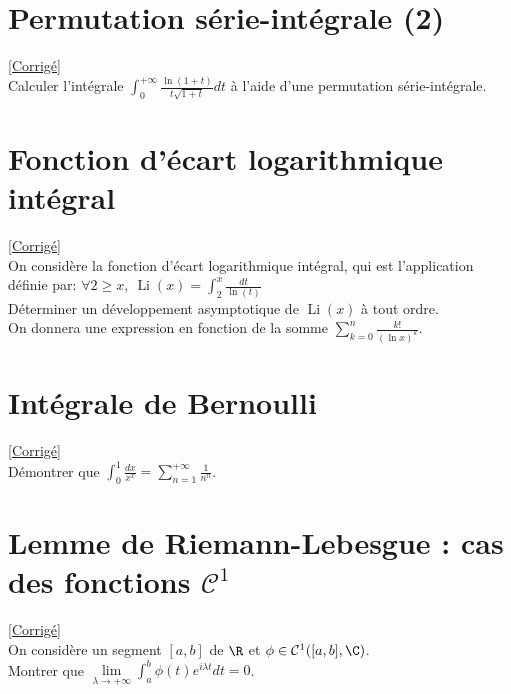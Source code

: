 \documentclass{book}
\begin{document}
	\section{Permutation série-intégrale (2)}
	\textcolor{blue}{\hyperref[sec:permutation-serie-integrale-2]{[Corrigé]}}\\
	\label{Permutation série-intégrale 2}
	Calculer l'intégrale $\displaystyle\int_0^{+\infty}\frac{\ln(1+t)}{t\sqrt{1+t}}dt$ à l'aide d'une permutation série-intégrale.
	
	\section{Fonction d'écart logarithmique intégral }
	\textcolor{blue}{\hyperref[sec:fonction-decart-logarithmique-integral-etoile2]{[Corrigé]}}\\
	\label{logint}
	\label{Fonction d'écart logarithmique intégral}
	On considère la fonction d'écart logarithmique intégral, qui est l'application définie par: $ \forall 2 \geq x,\ \operatorname{Li}(x)=\displaystyle\int_2^{x} \frac{dt}{\ln(t)}$
	\\Déterminer un développement asymptotique de $\operatorname{Li}(x)$ à tout ordre.\\
	On donnera une expression en fonction de la somme $\displaystyle\sum\limits_{k=0}^n\frac{k!}{(\ln x)^k}$.
	
	\section{Intégrale de Bernoulli }
	\textcolor{blue}{\hyperref[sec:integrale-de-bernoulli]{[Corrigé]}}\\
	\label{intégralebernoulli}
	\label{Intégrale de Bernoulli}
	Démontrer que $\displaystyle\int_0^1\frac{dx}{x^x}=\sum_{n=1}^{+\infty}\frac{1}{n^n}$.
	
	\section{Lemme de Riemann-Lebesgue : cas des fonctions $\mathcal C^1$ }
	\textcolor{blue}{\hyperref[sec:lemme-de-riemann-lebesgue--cas-des-fonctions-mathcalc1-etoile1]{[Corrigé]}}\\
	\label{riemannlebesgue}
	\label{Lemme de Riemann-Lebesgue : cas des fonction C1}
	On considère un segment $[a,b]$ de $\R$ et $\phi\in \mathcal{C}^1([a,b],\C)$.\\
	Montrer que $\lim\limits_{\lambda\to +\infty}\displaystyle\int_a^b\phi(t)e^{i\lambda t}dt=0$.
	
\end{document}

